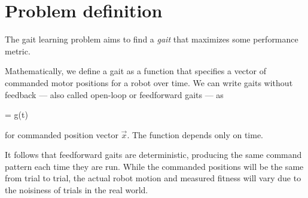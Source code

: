 \section{Problem definition}
%
%
%
%
%


The gait learning problem aims to find a \emph{gait} that maximizes
some performance metric.

Mathematically, we define a gait as a function that specifies
a vector of commanded motor positions for a robot over time.
We can write gaits without feedback --- also called open-loop or
feedforward gaits --- as

\be
{} = g(t)
\ee

\noindent for commanded position vector $\vec{x}$.  The
function depends only on time.

%
%

It follows that feedforward gaits are deterministic, producing the
same command pattern each time they are run.  While the commanded
positions will be the same from trial to trial, the actual robot
motion and measured fitness will vary due to the noisiness of trials
in the real world.


